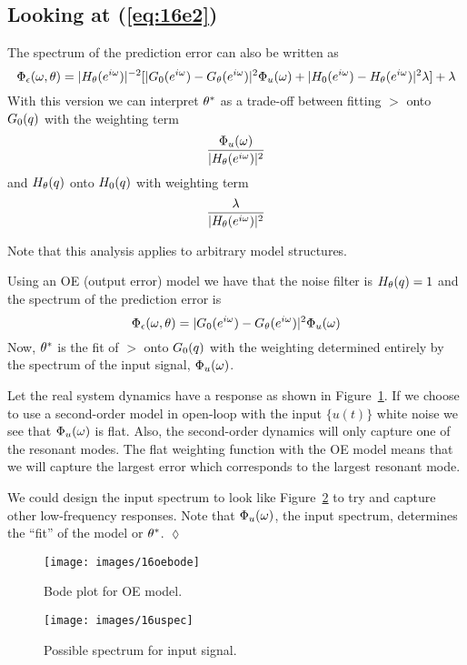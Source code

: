 \subsection{Looking at (\ref{eq:16e2})}
The spectrum of the prediction error can also be written as
$$\Phi_\epsilon(\omega,\theta) = |H_\theta(e^{i\omega})|^{-2}[|G_0(e^{i\omega})-G_\theta(e^{i\omega})|^2\Phi_u(\omega)+|H_0(e^{i\omega})-H_\theta(e^{i\omega})|^2\lambda]+\lambda$$
With this version we can interpret $\theta^\ast$ as a trade-off between fitting $\gt$ onto $G_0(q)$ with the weighting term
$$\frac{\Phi_u(\omega)}{|H_\theta(e^{i\omega})|^2}$$
and $H_\theta(q)$ onto $H_0(q)$ with weighting term
$$\frac{\lambda}{|H_\theta(e^{i\omega})|^2}$$

Note that this analysis applies to arbitrary model structures.

\begin{example}
Using an OE (output error) model we have that the noise filter is $H_\theta(q)=1$ and the spectrum of the prediction error is
$$\Phi_\epsilon(\omega,\theta) = |G_0(e^{i\omega})-G_\theta(e^{i\omega})|^2\Phi_u(\omega)$$
Now, $\theta^\ast$ is the fit of $\gt$ onto $G_0(q)$ with the weighting determined entirely by the spectrum of the input signal, $\Phi_u(\omega)$.

Let the real system dynamics have a response as shown in Figure~\ref{fig:16oebode}.
If we choose to use a second-order model in open-loop with the input $\{u(t)\}$ white noise we see that $\Phi_u(\omega)$ is flat.
Also, the second-order dynamics will only capture one of the resonant modes.
The flat weighting function with the OE model means that we will capture the largest error which corresponds to the largest resonant mode.

We could design the input spectrum to look like Figure~\ref{fig:16uspec} to try and capture other low-frequency responses.
Note that $\Phi_u(\omega)$, the input spectrum, determines the ``fit'' of the model or $\theta^\ast$.
$\lozenge$
\end{example}

\begin{figure}[ht!]
\centering
\texttt{[image: images/16oebode]}
\caption{Bode plot for OE model.}
\label{fig:16oebode}
\end{figure}

\begin{figure}[ht!]
\centering
\texttt{[image: images/16uspec]}
\caption{Possible spectrum for input signal.}
\label{fig:16uspec}
\end{figure}


